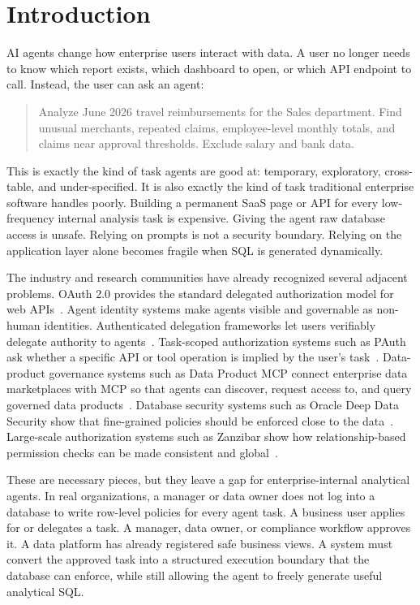 \documentclass[
]{article}
\begin{document}
\hypertarget{introduction}{%
\section{Introduction}\label{introduction}}

AI agents change how enterprise users interact with data. A user no
longer needs to know which report exists, which dashboard to open, or
which API endpoint to call. Instead, the user can ask an agent:

\begin{quote}
Analyze June 2026 travel reimbursements for the Sales department. Find
unusual merchants, repeated claims, employee-level monthly totals, and
claims near approval thresholds. Exclude salary and bank data.
\end{quote}

This is exactly the kind of task agents are good at: temporary,
exploratory, cross-table, and under-specified. It is also exactly the
kind of task traditional enterprise software handles poorly. Building a
permanent SaaS page or API for every low-frequency internal analysis
task is expensive. Giving the agent raw database access is unsafe.
Relying on prompts is not a security boundary. Relying on the
application layer alone becomes fragile when SQL is generated
dynamically.

The industry and research communities have already recognized several
adjacent problems. OAuth 2.0 provides the standard delegated
authorization model for web APIs~\cite{rfc6749}. Agent identity systems
make agents visible and governable as non-human identities.
Authenticated delegation frameworks let users verifiably delegate
authority to agents~\cite{south2025authenticateddelegation}.
Task-scoped authorization systems such as PAuth ask whether a specific
API or tool operation is implied by the user's
task~\cite{sharma2026pauth}. Data-product governance systems such as
Data Product MCP connect enterprise data marketplaces with MCP so that
agents can discover, request access to, and query governed data
products~\cite{tonnarelli2026dataproductmcp,mcp2025specification}.
Database security systems such as Oracle Deep Data Security show that
fine-grained policies should be enforced close to the
data~\cite{oracle2026deepdatasecuritydocs,oracle2026deepdatasecuritybrief}.
Large-scale authorization systems such as Zanzibar show how
relationship-based permission checks can be made consistent and
global~\cite{pang2019zanzibar}.

These are necessary pieces, but they leave a gap for enterprise-internal
analytical agents. In real organizations, a manager or data owner does
not log into a database to write row-level policies for every agent
task. A business user applies for or delegates a task. A manager, data
owner, or compliance workflow approves it. A data platform has already
registered safe business views. A system must convert the approved task
into a structured execution boundary that the database can enforce,
while still allowing the agent to freely generate useful analytical SQL.
\end{document}

